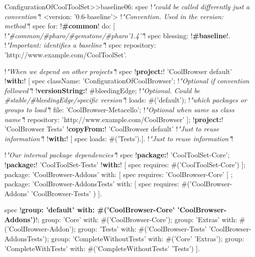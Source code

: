 \documentclass[a4paper,10pt,twoside]{book}
\begin{document}
\begin{footnotesize}
\begin{code}{}
ConfigurationOfCoolToolSet>>baseline06: spec 						!\emph{"could be called differently just a convention"}!
       <version: '0.6-baseline'> 						                        !\emph{"Convention. Used in the version: method"}!
       spec for: !\textbf{\#common}! do: [                                    !\emph{"\#common/\#pharo/\#gemstone/\#pharo'1.4'"}!     
              spec blessing: !\textbf{\#baseline}!.				                       !\emph{"Important: identifies a baseline"}!  
              spec repository: 'http://www.example.com/CoolToolSet'.
              
              !\emph{"When we depend on other projects"}!
              spec !\textbf{project:}! 'CoolBrowser default' !\textbf{with:}! [
                        spec
                            className: 'ConfigurationOfCoolBrowser';           !\emph{"Optional if convention followed"}!
                            !\textbf{versionString:}! #bleedingEdge;	!\emph{"Optional. Could be \#stable/\#bleedingEdge/specific version"}!
                            loads: #('default');			           	!\emph{"which packages or groups to load"}!
                            file: 'CoolBrowser-Metacello';               !\emph{"Optional when same as class name"}!
                            repository: 'http://www.example.com/CoolBrowser' ];
                     !\textbf{project:}! 'CoolBrowser Tests'         
                            !\textbf{copyFrom:}! 'CoolBrowser default'       !\emph{"Just to reuse information"}!
                            !\textbf{with:}! [ spec loads: #('Tests').].             !\emph{"Just to reuse information"}!
             
             !\emph{"Our internal package dependencies"}!
              spec 
                 !\textbf{package:}! 'CoolToolSet-Core';
                 !\textbf{package:}! 'CoolToolSet-Tests' !\textbf{with:}! [ spec requires: #('CoolToolSet-Core') ];
                 package: 'CoolBrowser-Addons' with: [ spec requires: 'CoolBrowser-Core' ] ;
                 package: 'CoolBrowser-AddonsTests' with: [ 
                      spec requires: #('CoolBrowser-Addons' 'CoolBrowser-Tests' ) ].
                      
      		 spec 
                 !\textbf{group: 'default' with: \#('CoolBrowser-Core' 'CoolBrowser-Addons')}!;
                 group: 'Core' with: #('CoolBrowser-Core');
                 group: 'Extras' with: #('CoolBrowser-Addon');
                 group: 'Tests' with: #('CoolBrowser-Tests' 'CoolBrowser-AddonsTests');
                 group: 'CompleteWithoutTests' with: #('Core' 'Extras');
                 group: 'CompleteWithTests' with: #('CompleteWithoutTests' 'Tests')
          ].  
\end{code}\end{footnotesize} 
\end{document}
